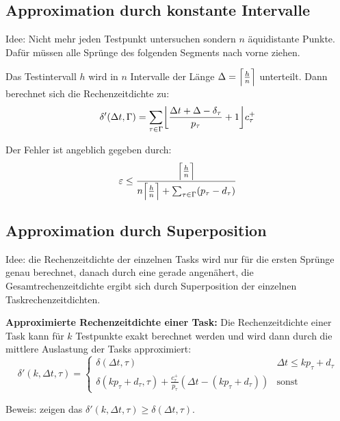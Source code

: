 \subsection{Approximation durch konstante Intervalle}
Idee: Nicht mehr jeden Testpunkt untersuchen sondern $n$ äquidistante Punkte. Dafür
müssen alle Sprünge des folgenden Segments nach vorne ziehen.

\begin{tcolorbox}
Das Testintervall $h$ wird in $n$ Intervalle der Länge $\Delta=\ceil*{\frac{h}{n}}$
unterteilt. Dann berechnet sich die Rechenzeitdichte zu:
\begin{equation}
    \delta'(\Delta t, \Gamma) = \sum_{\tau \in \Gamma} \floor*{
        \frac{\Delta t + \Delta - \delta_\tau}{p_\tau} + 1} c_\tau^+
\end{equation}
\end{tcolorbox}

Der Fehler ist angeblich gegeben durch:
\begin{equation}
    \varepsilon \leq \frac{\ceil*{\frac{h}{n}}}{n \ceil*{\frac{h}{n}} +
        \sum_{\tau \in \Gamma} (p_\tau - d_\tau)}
\end{equation}

\subsection{Approximation durch Superposition}
Idee: die Rechenzeitdichte der einzelnen Tasks wird nur für die ersten Sprünge
genau berechnet, danach durch eine gerade angenähert, die Gesamtrechenzeitdichte
ergibt sich durch Superposition der einzelnen Taskrechenzeitdichten.

\begin{tcolorbox}
    \textbf{Approximierte Rechenzeitdichte einer Task:} Die Rechenzeitdichte einer
    Task kann für $k$ Testpunkte exakt berechnet werden und wird dann durch die
    mittlere Auslastung der Tasks approximiert:
    \begin{equation}
        \delta'(k, \Delta t, \tau) = \begin{cases}
            \delta(\Delta t, \tau) & \Delta t \leq k p_\tau + d_\tau \\
            \delta(kp_\tau+d_\tau, \tau) + \frac{c^+_\tau}{p_\tau}
            (\Delta t - (k p_\tau + d_\tau)) & \text{sonst}
        \end{cases}
    \end{equation}
\end{tcolorbox}
Beweis: zeigen das $\delta'(k, \Delta t, \tau) \geq \delta(\Delta t, \tau)$.

